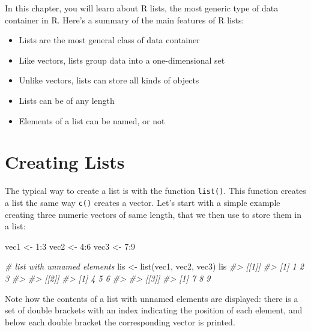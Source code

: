 \documentclass[
]{book}
\newenvironment{Shaded}{\begin{snugshade}}{\end{snugshade}}
\newcommand{\CommentTok}[1]{\textcolor[rgb]{0.56,0.35,0.01}{\textit{#1}}}
\newcommand{\DecValTok}[1]{\textcolor[rgb]{0.00,0.00,0.81}{#1}}
\newcommand{\FunctionTok}[1]{\textcolor[rgb]{0.00,0.00,0.00}{#1}}
\newcommand{\NormalTok}[1]{#1}
\newcommand{\OtherTok}[1]{\textcolor[rgb]{0.56,0.35,0.01}{#1}}
\newcommand{\SpecialCharTok}[1]{\textcolor[rgb]{0.00,0.00,0.00}{#1}}
\providecommand{\tightlist}{%
  \setlength{\itemsep}{0pt}\setlength{\parskip}{0pt}}
\begin{document}
In this chapter, you will learn about R lists, the most generic type of data
container in R. Here's a summary of the main features of R lists:

\begin{itemize}
\tightlist
\item
  Lists are the most general class of data container
\item
  Like vectors, lists group data into a one-dimensional set
\item
  Unlike vectors, lists can store all kinds of objects
\item
  Lists can be of any length
\item
  Elements of a list can be named, or not
\end{itemize}

\hypertarget{creating-lists}{%
\section{Creating Lists}\label{creating-lists}}

The typical way to create a list is with the function \texttt{list()}. This function
creates a list the same way \texttt{c()} creates a vector. Let's start with a simple
example creating three numeric vectors of same length, that we then use to
store them in a list:

\begin{Shaded}
\begin{Highlighting}[]
\NormalTok{vec1 }\OtherTok{\textless{}{-}} \DecValTok{1}\SpecialCharTok{:}\DecValTok{3}
\NormalTok{vec2 }\OtherTok{\textless{}{-}} \DecValTok{4}\SpecialCharTok{:}\DecValTok{6}
\NormalTok{vec3 }\OtherTok{\textless{}{-}} \DecValTok{7}\SpecialCharTok{:}\DecValTok{9}

\CommentTok{\# list with unnamed elements}
\NormalTok{lis }\OtherTok{\textless{}{-}} \FunctionTok{list}\NormalTok{(vec1, vec2, vec3)}
\NormalTok{lis}
\CommentTok{\#\textgreater{} [[1]]}
\CommentTok{\#\textgreater{} [1] 1 2 3}
\CommentTok{\#\textgreater{} }
\CommentTok{\#\textgreater{} [[2]]}
\CommentTok{\#\textgreater{} [1] 4 5 6}
\CommentTok{\#\textgreater{} }
\CommentTok{\#\textgreater{} [[3]]}
\CommentTok{\#\textgreater{} [1] 7 8 9}
\end{Highlighting}
\end{Shaded}

Note how the contents of a list with unnamed elements are displayed: there is a
set of double brackets with an index indicating the position of each element,
and below each double bracket the corresponding vector is printed.
\end{document}
